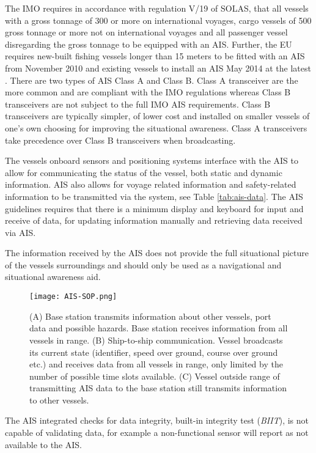 \documentclass[../main.tex]{subfiles}
\begin{document}
The IMO requires in accordance with regulation V/19 of SOLAS, that all vessels with a gross tonnage of 300 or more on international voyages, cargo vessels of 500 gross tonnage or more not on international voyages and all passenger vessel disregarding the gross tonnage to be equipped with an AIS. Further, the EU requires new-built fishing vessels longer than 15 meters to be fitted with an AIS from November 2010 and existing vessels to install an AIS May 2014 at the latest \cite{EU_2011}. There are two types of AIS Class A and Class B. Class A transceiver are the more common and are compliant with the IMO regulations whereas Class B transceivers are not subject to the full IMO AIS requirements. Class B transceivers are typically simpler, of lower cost and installed on smaller vessels of one's own choosing for improving the situational awareness. Class A transceivers take precedence over Class B transceivers when broadcasting.

The vessels onboard sensors and positioning systems interface with the AIS to allow for communicating the status of the vessel, both static and dynamic information. AIS also allows for voyage related information and safety-related information to be transmitted via the system, see Table \ref{tab:ais-data}. The AIS guidelines requires that there is a minimum display and keyboard for input and receive of data, for updating information manually and retrieving data received via AIS.

The information received by the AIS does not provide the full situational picture of the vessels surroundings and should only be used as a navigational and situational awareness aid.

\begin{figure}[H]
\centering
\texttt{[image: AIS-SOP.png]}
\caption{(A) Base station transmits information about other vessels, port data and possible hazards. Base station receives information from all vessels in range. (B) Ship-to-ship communication. Vessel broadcasts its current state (identifier, speed over ground, course over ground etc.) and receives data from all vessels in range, only limited by the number of possible time slots available. (C) Vessel outside range of transmitting AIS data to the base station still transmits information to other vessels.}
\label{fig:ais-sop}
\end{figure}

The AIS integrated checks for data integrity, built-in integrity test (\textit{BIIT}), is not capable of validating data, for example a non-functional sensor will report as not available to the AIS.
\end{document}
